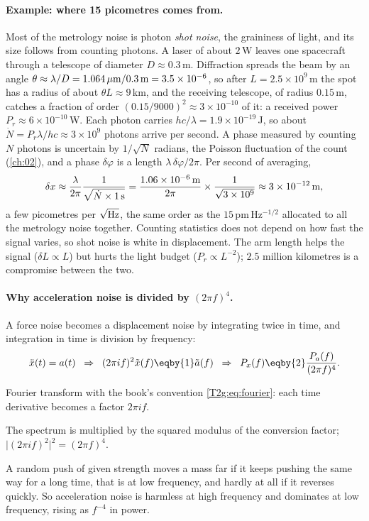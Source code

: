 \paragraph{Example: where 15 picometres comes from.}
Most of the metrology noise is photon \emph{shot noise}, the graininess of light, and its size follows from counting photons. A laser of about $2$\,W leaves one spacecraft through a telescope of diameter $D\approx0.3$\,m. Diffraction spreads the beam by an angle $\theta\approx\lambda/D=1.064\,\mu{\rm m}/0.3\,{\rm m}=3.5\times10^{-6}$, so after $L=2.5\times10^9$\,m the spot has a radius of about $\theta L\approx9$\,km, and the receiving telescope, of radius $0.15$\,m, catches a fraction of order $(0.15/9000)^2\approx3\times10^{-10}$ of it: a received power $P_r\approx6\times10^{-10}$\,W. Each photon carries $hc/\lambda=1.9\times10^{-19}$\,J, so about $\dot N=P_r\lambda/hc\approx3\times10^9$ photons arrive per second. A phase measured by counting $N$ photons is uncertain by $1/\sqrt N$ radians, the Poisson fluctuation of the count (\cref{ch:02}), and a phase $\delta\varphi$ is a length $\lambda\,\delta\varphi/2\pi$. Per second of averaging,
\begin{equation*}
  \delta x\approx\frac{\lambda}{2\pi}\frac{1}{\sqrt{\dot N\times1\,{\rm s}}}
  =\frac{1.06\times10^{-6}\,{\rm m}}{2\pi}\times\frac{1}{\sqrt{3\times10^9}}\approx3\times10^{-12}\,{\rm m},
\end{equation*}
a few picometres per $\sqrt{\rm Hz}$, the same order as the $15$\,pm\,Hz$^{-1/2}$ allocated to all the metrology noise together. Counting statistics does not depend on how fast the signal varies, so shot noise is white in displacement. The arm length helps the signal ($\delta L\propto L$) but hurts the light budget ($P_r\propto L^{-2}$); $2.5$ million kilometres is a compromise between the two.

\paragraph{Why acceleration noise is divided by $(2\pi f)^4$.}
A force noise becomes a displacement noise by integrating twice in time, and integration in time is division by frequency:
\begin{align}
  \ddot x(t)=a(t)
  \;\;\Rightarrow\;\;
  (2\pi i f)^2\tilde x(f)\eqby{1}\tilde a(f)
  \;\;\Rightarrow\;\;
  P_x(f)\eqby{2}\frac{P_a(f)}{(2\pi f)^4}.
  \label{T2g:eq:acc-disp}
\end{align}
\begin{explain}
  \item Fourier transform with the book's convention \eqref{T2g:eq:fourier}: each time derivative becomes a factor $2\pi if$.
  \item The spectrum is multiplied by the squared modulus of the conversion factor; $\lvert(2\pi if)^2\rvert^2=(2\pi f)^4$.
\end{explain}
A random push of given strength moves a mass far if it keeps pushing the same way for a long time, that is at low frequency, and hardly at all if it reverses quickly. So acceleration noise is harmless at high frequency and dominates at low frequency, rising as $f^{-4}$ in power.

